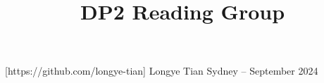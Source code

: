 \documentclass[11pt,xcolor={dvipsnames},hyperref={pdftex,pdfpagemode=UseNone,hidelinks,pdfdisplaydoctitle=true},usepdftitle=false]{beamer}
\begin{document}
\title{DP2 Reading Group}

\information
%
[https://github.com/longye-tian]
%
{Longye Tian}
%
{Sydney -- September 2024}

\frame{\titlepage}

\begin{frame}
\end{frame}
\end{document}
